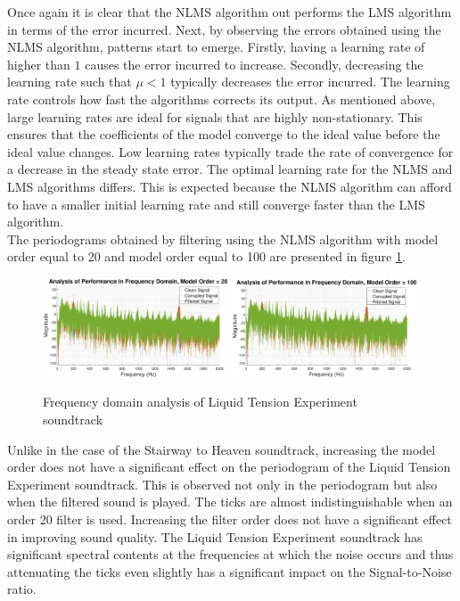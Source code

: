 \documentclass{article}
\begin{document}
Once again it is clear that the NLMS algorithm out performs the LMS algorithm in terms of the error incurred. Next, by observing the errors obtained using the NLMS algorithm, patterns start to emerge. Firstly, having a learning rate of higher than $1$ causes the error incurred to increase. Secondly, decreasing the learning rate such that $\mu < 1$ typically decreases the error incurred. The learning rate controls how fast the algorithms corrects its output. As mentioned above, large learning rates are ideal for signals that are highly non-stationary. This ensures that the coefficients of the model converge to the ideal value before the ideal value changes. Low learning rates typically trade the rate of convergence for a decrease in the steady state error. The optimal learning rate for the NLMS and LMS algorithms differs. This is expected because the NLMS algorithm can afford to have a smaller initial learning rate and still converge faster than the LMS algorithm.\\

The periodograms obtained by filtering using the NLMS algorithm with model order equal to 20 and model order equal to 100 are presented in figure \ref{fig:lte_freq_model_20}. 

\begin{figure}[H]
    \centering
    \includegraphics[width=0.49\textwidth]{lte_freq_domain_order_20}
    \includegraphics[width=0.49\textwidth]{lte_freq_domain_order_100}
    \caption{Frequency domain analysis of Liquid Tension Experiment soundtrack}
    \label{fig:lte_freq_model_20}
\end{figure}

Unlike in the case of the Stairway to Heaven soundtrack, increasing the model order does not have a significant effect on the periodogram of the Liquid Tension Experiment soundtrack. This is observed not only in the periodogram but also when the filtered sound is played. The ticks are almost indistinguishable when an order 20 filter is used. Increasing the filter order does not have a significant effect in improving sound quality. The Liquid Tension Experiment soundtrack has significant spectral contents at the frequencies at which the noise occurs and thus attenuating the ticks even slightly has a significant impact on the Signal-to-Noise ratio.
\end{document}
